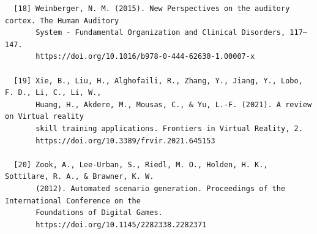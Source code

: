 \documentclass[manuscript,screen,review]{acmart}
\begin{document}
\begin{verbatim}
  [18] Weinberger, N. M. (2015). New Perspectives on the auditory cortex. The Human Auditory 
       System - Fundamental Organization and Clinical Disorders, 117–147. 
       https://doi.org/10.1016/b978-0-444-62630-1.00007-x  
  
  [19] Xie, B., Liu, H., Alghofaili, R., Zhang, Y., Jiang, Y., Lobo, F. D., Li, C., Li, W., 
       Huang, H., Akdere, M., Mousas, C., & Yu, L.-F. (2021). A review on Virtual reality 
       skill training applications. Frontiers in Virtual Reality, 2. 
       https://doi.org/10.3389/frvir.2021.645153  
  
  [20] Zook, A., Lee-Urban, S., Riedl, M. O., Holden, H. K., Sottilare, R. A., & Brawner, K. W. 
       (2012). Automated scenario generation. Proceedings of the International Conference on the 
       Foundations of Digital Games. 
       https://doi.org/10.1145/2282338.2282371 
\end{verbatim}
\end{document}
